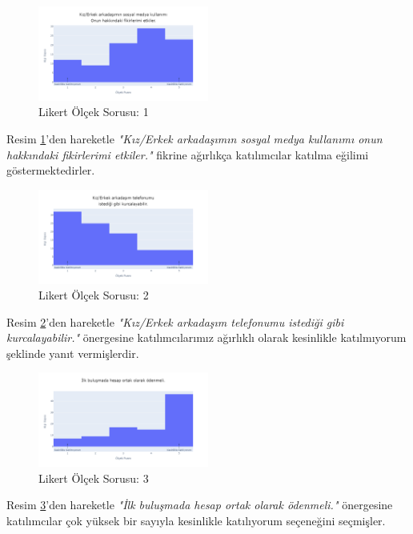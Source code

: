 \documentclass{article}
\begin{document}
\begin{twocolumn}
    \begin{figure}[htbp]
        \centering
        \includegraphics[width=0.5\textwidth]{Imgs/likert1.png}
        \caption{Likert Ölçek Sorusu: 1}
        \label{likert1}
    \end{figure}
Resim \ref{likert1}'den hareketle \textit{"Kız/Erkek arkadaşımın  sosyal medya kullanımı onun hakkındaki fikirlerimi etkiler."} fikrine ağırlıkça katılımcılar katılma eğilimi göstermektedirler.

    \begin{figure}[htbp]
        \centering
        \includegraphics[width=0.5\textwidth]{Imgs/likert2.png}
        \caption{Likert Ölçek Sorusu: 2}
        \label{likert2}
    \end{figure}
Resim \ref{likert2}'den hareketle \textit{"Kız/Erkek arkadaşım telefonumu istediği gibi kurcalayabilir."} önergesine katılımcılarımız ağırlıklı olarak kesinlikle katılmıyorum şeklinde yanıt vermişlerdir.

    \begin{figure}[htbp]
        \centering
        \includegraphics[width=0.5\textwidth]{Imgs/likert3.png}
        \caption{Likert Ölçek Sorusu: 3}
        \label{likert3}
    \end{figure}
Resim \ref{likert3}'den hareketle \textit{"İlk buluşmada hesap ortak olarak ödenmeli."} önergesine katılımcılar çok yüksek bir sayıyla kesinlikle katılıyorum seçeneğini seçmişler.


\end{twocolumn}
\end{document}
